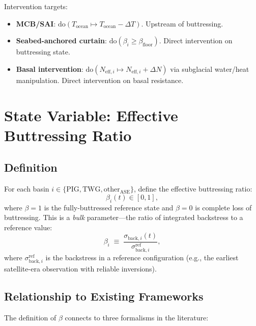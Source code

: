 \documentclass[11pt]{article}
\theoremstyle{definition}
\begin{document}
Intervention targets:
\begin{itemize}
  \item \textbf{MCB/SAI}: $\text{do}(T_{\text{ocean}} \mapsto T_{\text{ocean}} - \Delta T)$.  Upstream of buttressing.
  \item \textbf{Seabed-anchored curtain}: $\text{do}(\beta_i \geq \beta_{\text{floor}})$.  Direct intervention on buttressing state.
  \item \textbf{Basal intervention}: $\text{do}(N_{\text{eff},i} \mapsto N_{\text{eff},i} + \Delta N)$ via subglacial water/heat manipulation.  Direct intervention on basal resistance.
\end{itemize}


\section{State Variable: Effective Buttressing Ratio}
\label{sec:buttressing_state}

\subsection{Definition}

For each basin $i \in \{\text{PIG}, \text{TWG}, \text{other}_\text{ASE}\}$, define the effective buttressing ratio:
\begin{equation}
  \beta_i(t) \in [0, 1],
  \label{eq:beta_def}
\end{equation}
where $\beta = 1$ is the fully-buttressed reference state and $\beta = 0$ is complete loss of buttressing.  This is a \emph{bulk} parameter---the ratio of integrated backstress to a reference value:
\begin{equation}
  \beta_i \;\equiv\; \frac{\sigma_{\text{back},i}(t)}{\sigma_{\text{back},i}^{\text{ref}}},
\end{equation}
where $\sigma_{\text{back},i}^{\text{ref}}$ is the backstress in a reference configuration (e.g., the earliest satellite-era observation with reliable inversions).

\subsection{Relationship to Existing Frameworks}

The definition of $\beta$ connects to three formalisms in the literature:
\end{document}
